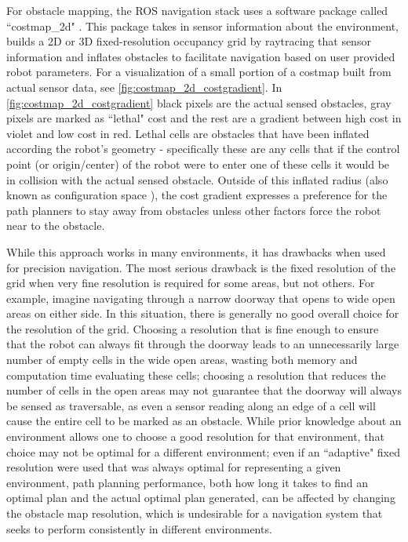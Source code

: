 For obstacle mapping, the ROS navigation stack uses a software package called ``costmap\_2d" . This package takes in sensor information about the environment, builds a 2D or 3D fixed-resolution occupancy grid by raytracing that sensor information and inflates obstacles to facilitate navigation based on user provided robot parameters. For a visualization of a small portion of a costmap built from actual sensor data, see \autoref{fig:costmap_2d_costgradient}. In \autoref{fig:costmap_2d_costgradient} black pixels are the actual sensed obstacles, gray pixels are marked as ``lethal" cost and the rest are a gradient between high cost in violet and low cost in red. Lethal cells are obstacles that have been inflated according the robot's geometry - specifically these are any cells that if the control point (or origin/center) of the robot were to enter one of these cells it would be in collision with the actual sensed obstacle. Outside of this inflated radius (also known as configuration space ), the cost gradient expresses a preference for the path planners to stay away from obstacles unless other factors force the robot near to the obstacle.

While this approach works in many environments, it has drawbacks when used for precision navigation. The most serious drawback is the fixed resolution of the grid when very fine resolution is required for some areas, but not others. For example, imagine navigating through a narrow doorway that opens to wide open areas on either side. In this situation, there is generally no good overall choice for the resolution of the grid. Choosing a resolution that is fine enough to ensure that the robot can always fit through the doorway leads to an unnecessarily large number of empty cells in the wide open areas, wasting both memory and computation time evaluating these cells; choosing a resolution that reduces the number of cells in the open areas may not guarantee that the doorway will always be sensed as traversable, as even a sensor reading along an edge of a cell will cause the entire cell to be marked as an obstacle. While prior knowledge about an environment allows one to choose a good resolution for that environment, that choice may not be optimal for a different environment; even if an ``adaptive" fixed resolution were used that was always optimal for representing a given environment, path planning performance, both how long it takes to find an optimal plan and the actual optimal plan generated, can be affected by changing the obstacle map resolution, which is undesirable for a navigation system that seeks to perform consistently in different environments.

